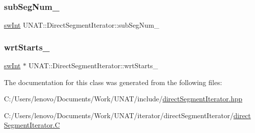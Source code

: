 \subsubsection{\texorpdfstring{subSegNum\_}{subSegNum\_}}
{\footnotesize\ttfamily \mbox{\hyperlink{include_2swMacro_8h_a113cf5f6b5377cdf3fac6aa4e443e9aa}{sw\+Int}} U\+N\+A\+T\+::\+Direct\+Segment\+Iterator\+::sub\+Seg\+Num\+\_\+\hspace{0.3cm}{\ttfamily [private]}}

\mbox{\label{classUNAT_1_1DirectSegmentIterator_a320f49fbd95b27d56f5f9ccfa9947bf9}} 
\subsubsection{\texorpdfstring{wrtStarts\_}{wrtStarts\_}}
{\footnotesize\ttfamily \mbox{\hyperlink{include_2swMacro_8h_a113cf5f6b5377cdf3fac6aa4e443e9aa}{sw\+Int}} $\ast$ U\+N\+A\+T\+::\+Direct\+Segment\+Iterator\+::wrt\+Starts\+\_\+\hspace{0.3cm}{\ttfamily [private]}}



The documentation for this class was generated from the following files\+:\begin{DoxyCompactItemize}
\item 
C\+:/\+Users/lenovo/\+Documents/\+Work/\+U\+N\+A\+T/include/\mbox{\hyperlink{include_2directSegmentIterator_8hpp}{direct\+Segment\+Iterator.\+hpp}}\item 
C\+:/\+Users/lenovo/\+Documents/\+Work/\+U\+N\+A\+T/iterator/direct\+Segment\+Iterator/\mbox{\hyperlink{iterator_2directSegmentIterator_2directSegmentIterator_8C}{direct\+Segment\+Iterator.\+C}}\end{DoxyCompactItemize}

